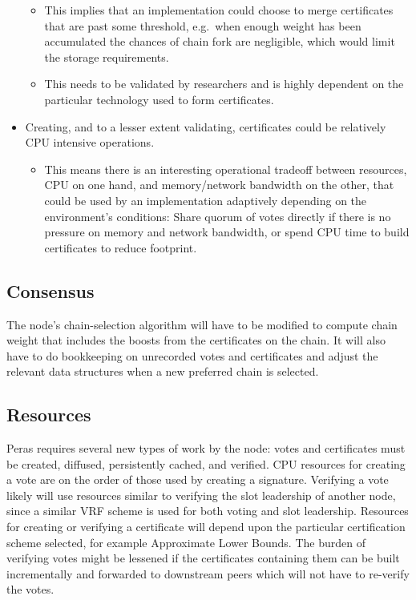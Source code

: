 \documentclass[10pt]{article}
\providecommand{\tightlist}{%
  \setlength{\itemsep}{0pt}\setlength{\parskip}{0pt}}
\begin{document}
\begin{itemize}
  \begin{itemize}
  \tightlist
  \item
    This implies that an implementation could choose to merge
    certificates that are past some threshold, e.g.~when enough weight
    has been accumulated the chances of chain fork are negligible, which
    would limit the storage requirements.
  \item
    This needs to be validated by researchers and is highly dependent on
    the particular technology used to form certificates.
  \end{itemize}
\item
  Creating, and to a lesser extent validating, certificates could be
  relatively CPU intensive operations.

  \begin{itemize}
  \tightlist
  \item
    This means there is an interesting operational tradeoff between
    resources, CPU on one hand, and memory/network bandwidth on the
    other, that could be used by an implementation adaptively depending
    on the environment's conditions: Share quorum of votes directly if
    there is no pressure on memory and network bandwidth, or spend CPU
    time to build certificates to reduce footprint.
  \end{itemize}
\end{itemize}

\subsection{Consensus}\label{consensus}

The node's chain-selection algorithm will have to be modified to compute
chain weight that includes the boosts from the certificates on the
chain. It will also have to do bookkeeping on unrecorded votes and
certificates and adjust the relevant data structures when a new
preferred chain is selected.

\subsection{Resources}\label{resources}

Peras requires several new types of work by the node: votes and
certificates must be created, diffused, persistently cached, and
verified. CPU resources for creating a vote are on the order of those
used by creating a signature. Verifying a vote likely will use resources
similar to verifying the slot leadership of another node, since a
similar VRF scheme is used for both voting and slot leadership.
Resources for creating or verifying a certificate will depend upon the
particular certification scheme selected, for example Approximate Lower
Bounds. The burden of verifying votes might be lessened if the
certificates containing them can be built incrementally and forwarded to
downstream peers which will not have to re-verify the votes.
\end{document}
